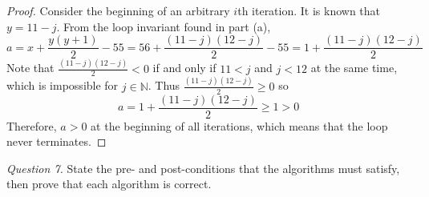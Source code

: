 \documentclass[11pt]{article}
\begin{document}
\begin{enumerate}
\begin{proof}
            Consider the beginning of an arbitrary \(i\)th iteration. It is known that \(y = 11 - j\). From the loop invariant found in part (a),
            \[
                a = x + \frac{y(y+1)}{2} - 55 = 56 + \frac{(11-j)(12-j)}{2} - 55 = 1 + \frac{(11-j)(12-j)}{2}
            \]
            Note that \(\frac{(11-j)(12-j)}{2} < 0\) if and only if \(11 < j\) and \(j < 12\) at the same time, which is impossible for \(j \in \mathbb{N}\). Thus \(\frac{(11-j)(12-j)}{2} \geq 0\) so
            \[
                a = 1 + \frac{(11-j)(12-j)}{2} \geq 1 > 0
            \]
            Therefore, \(a >0\) at the beginning of all iterations, which means that the loop never terminates.

        \end{proof}
    \end{enumerate}
    \noindent\textit{Question 7.} State the pre- and post-conditions that the algorithms must satisfy, then prove that each algorithm is correct.
\end{document}
